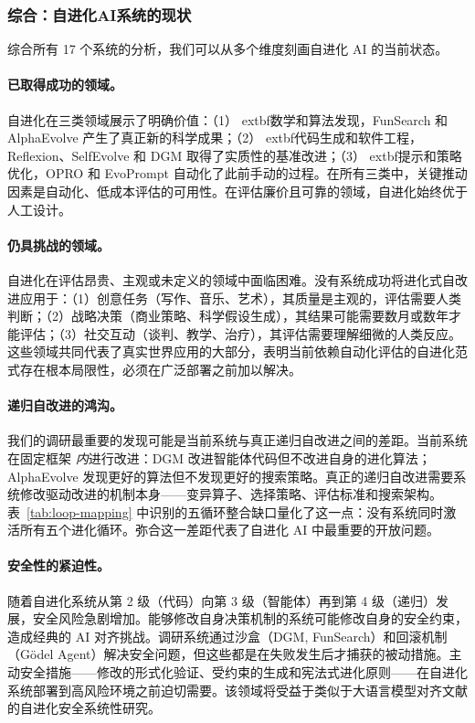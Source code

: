 \subsubsection{综合：自进化AI系统的现状}

综合所有 17 个系统的分析，我们可以从多个维度刻画自进化 AI 的当前状态。

\paragraph{已取得成功的领域。}
自进化在三类领域展示了明确价值：（1）	extbf{数学和算法发现}，FunSearch 和 AlphaEvolve 产生了真正新的科学成果；（2）	extbf{代码生成和软件工程}，Reflexion、SelfEvolve 和 DGM 取得了实质性的基准改进；（3）	extbf{提示和策略优化}，OPRO 和 EvoPrompt 自动化了此前手动的过程。在所有三类中，关键推动因素是自动化、低成本评估的可用性。在评估廉价且可靠的领域，自进化始终优于人工设计。

\paragraph{仍具挑战的领域。}
自进化在评估昂贵、主观或未定义的领域中面临困难。没有系统成功将进化式自改进应用于：（1）创意任务（写作、音乐、艺术），其质量是主观的，评估需要人类判断；（2）战略决策（商业策略、科学假设生成），其结果可能需要数月或数年才能评估；（3）社交互动（谈判、教学、治疗），其评估需要理解细微的人类反应。这些领域共同代表了真实世界应用的大部分，表明当前依赖自动化评估的自进化范式存在根本局限性，必须在广泛部署之前加以解决。

\paragraph{递归自改进的鸿沟。}
我们的调研最重要的发现可能是当前系统与真正递归自改进之间的差距。当前系统在固定框架 \emph{内}进行改进：DGM 改进智能体代码但不改进自身的进化算法；AlphaEvolve 发现更好的算法但不发现更好的搜索策略。真正的递归自改进需要系统修改驱动改进的机制本身——变异算子、选择策略、评估标准和搜索架构。表~\ref{tab:loop-mapping} 中识别的五循环整合缺口量化了这一点：没有系统同时激活所有五个进化循环。弥合这一差距代表了自进化 AI 中最重要的开放问题。

\paragraph{安全性的紧迫性。}
随着自进化系统从第 2 级（代码）向第 3 级（智能体）再到第 4 级（递归）发展，安全风险急剧增加。能够修改自身决策机制的系统可能修改自身的安全约束，造成经典的 AI 对齐挑战。调研系统通过沙盒（DGM, FunSearch）和回滚机制（G\"{o}del Agent）解决安全问题，但这些都是在失败发生后才捕获的被动措施。主动安全措施——修改的形式化验证、受约束的生成和宪法式进化原则——在自进化系统部署到高风险环境之前迫切需要。该领域将受益于类似于大语言模型对齐文献的自进化安全系统性研究。

